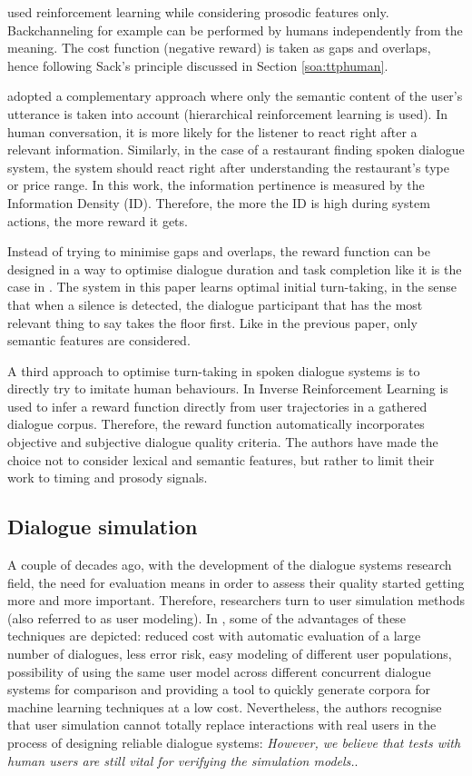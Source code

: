         \cite{Jonsdottir2008} used reinforcement learning while considering prosodic features only. Backchanneling for example can be performed by humans independently from the meaning. The cost function (negative reward) is taken as gaps and overlaps, hence following Sack's principle discussed in Section \ref{soa:ttphuman}.
        
        \cite{Dethlefs2012} adopted a complementary approach where only the semantic content of the user's utterance is taken into account (hierarchical reinforcement learning is used). In human conversation, it is more likely for the listener to react right after a relevant information. Similarly, in the case of a restaurant finding spoken dialogue system, the system should react right after understanding the restaurant's type or price range. In this work, the information pertinence is measured by the Information Density (ID). Therefore, the more the ID is high during system actions, the more reward it gets.
        
        Instead of trying to minimise gaps and overlaps, the reward function can be designed in a way to optimise dialogue duration and task completion like it is the case in \cite{Selfridge2010}. The system in this paper learns optimal initial turn-taking, in the sense that when a silence is detected, the dialogue participant that has the most relevant thing to say takes the floor first. Like in the previous paper, only semantic features are considered.
        
        A third approach to optimise turn-taking in spoken dialogue systems is to directly try to imitate human behaviours. In \cite{Kim2014} Inverse Reinforcement Learning is used to infer a reward function directly from user trajectories in a gathered dialogue corpus. Therefore, the reward function automatically incorporates objective and subjective dialogue quality criteria. The authors have made the choice not to consider lexical and semantic features, but rather to limit their work to timing and prosody signals.
    
    \subsection{Dialogue simulation}
    
    	A couple of decades ago, with the development of the dialogue systems research field, the need for evaluation means in order to assess their quality started getting more and more important. Therefore, researchers turn to user simulation methods (also referred to as user modeling). In \cite{Eckert1997}, some of the advantages of these techniques are depicted: reduced cost with automatic evaluation of a large number of dialogues, less error risk, easy modeling of different user populations, possibility of using the same user model across different concurrent dialogue systems for comparison and providing a tool to quickly generate corpora for machine learning techniques at a low cost. Nevertheless, the authors recognise that user simulation cannot totally replace interactions with real users in the process of designing reliable dialogue systems: \textit{However, we believe that tests with human users are still vital for verifying the simulation models.}.
        
